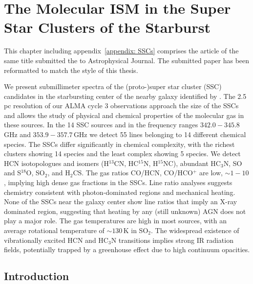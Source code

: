 \chapter{The Molecular ISM in the Super Star Clusters of the Starburst }
\label{chapter: SSCs}

\begin{papernote}
This chapter including appendix~\ref{appendix: SSCs} comprises the article of the same title submitted the to Astrophysical Journal. The submitted paper has been reformatted to match the style of this thesis.
\end{papernote}

\begin{paperabstract}
We present submillimeter spectra of the (proto-)super star cluster (SSC) candidates in the starbursting center of the nearby galaxy  identified by \citet{2018ApJ...869..126L}. The 2.5\,pc resolution of our ALMA cycle 3 observations approach the size of the SSCs and allows the study of physical and chemical properties of the molecular gas in these sources. 
In the 14 SSC sources and in the frequency ranges $342.0-345.8$\,GHz and $353.9-357.7$\,GHz we detect 55 lines belonging to 14 different chemical species. The SSCs differ significantly in chemical complexity, with the richest clusters showing 14 species and the least complex showing 5 species. We detect HCN isotopologues and isomers (H$^{13}$CN, HC$^{15}$N, H$^{15}$NC), abundant HC$_3$N, SO and S$^{18}$O, SO$_2$, and H$_2$CS. The gas ratios CO/HCN, CO/HCO$^+$ are low, $\sim 1-10$, implying high dense gas fractions in the SSCs.
Line ratio analyses suggests chemistry consistent with photon-dominated regions and mechanical heating. 
None of the SSCs near the galaxy center show line ratios that imply an X-ray dominated region, suggesting that heating by any (still unknown) AGN does not play a major role.
The gas temperatures are high in most sources, with an average rotational temperature of $\sim 130$\,K in SO$_2$. 
The widespread existence of vibrationally excited HCN and HC$_3$N transitions implies strong IR radiation fields, potentially trapped by a greenhouse effect due to high continuum opacities.
\end{paperabstract}



\section{Introduction} \label{SSCs: section: introduction}

